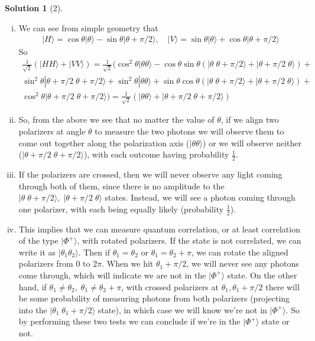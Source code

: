 \documentclass[11pt]{article}
\theoremstyle{definition}
\newtheorem*{solution}{Solution}
\newcommand{\eq}{\begin{equation}\begin{aligned}}
\newcommand{\qe}{\end{aligned}\end{equation}}
\newcommand{\ket}[1]{|#1\rangle}
\begin{document}
\begin{solution}[2]
  \begin{enumerate}[(i)]
    \item We can see from simple geometry that
    \eq
      \ket{H}=\cos\theta\ket{\theta}-\sin\theta\ket{\theta+\pi/2},\quad \ket{V}=\sin\theta\ket{\theta}+\cos\theta\ket{\theta+\pi/2}
    \qe
    So
    \eq
      \frac{1}{\sqrt{2}}(\ket{HH}+\ket{VV})=\frac{1}{\sqrt{2}}(\cos^2\theta\ket{\theta\theta}-\cos\theta\sin\theta(\ket{\theta\;\theta+\pi/2}+\ket{\theta+\pi/2\;\theta})+\\
      \sin^2\theta\ket{\theta+\pi/2\;\theta+\pi/2}+\sin^2\theta\ket{\theta\theta}+\sin\theta\cos\theta(\ket{\theta\;\theta+\pi/2}+\ket{\theta+\pi/2\;\theta})+\\
      \cos^2\theta\ket{\theta+\pi/2\;\theta+\pi/2})=\boxed{\frac{1}{\sqrt{2}}(\ket{\theta\theta}+\ket{\theta+\pi/2\;\theta+\pi/2})}
    \qe
    \item So, from the above we see that no matter the value of $\theta$, if we align two polarizers at angle $\theta$ to measure the two photons we will observe them to come out together along the polarization axis ($\ket{\theta\theta}$) or we will observe neither ($\ket{\theta+\pi/2\;\theta+\pi/2}$), with each outcome having probability $\frac{1}{2}$.
    \item If the polarizers are crossed, then we will never observe any light coming through both of them, since there is no amplitude to the $\ket{\theta\;\theta+\pi/2},\;\ket{\theta+\pi/2\;\theta}$ states. Instead, we will see a photon coming through one polarizer, with each being equally likely (probability $\boxed{\frac{1}{2}}$).
    \item This implies that we can measure quantum correlation, or at least correlation of the type $\ket{\Phi^+}$, with rotated polarizers. If the state is not correlated, we can write it as $\ket{\theta_1\theta_2}$. Then if $\theta_1=\theta_2$ or $\theta_1=\theta_2+\pi$, we can rotate the aligned polarizers from 0 to $2\pi$. When we hit $\theta_1+\pi/2$, we will never see any photons come through, which will indicate we are not in the $\ket{\Phi^+}$ state. On the other hand, if $\theta_1\neq \theta_2,\;\theta_1\neq \theta_2+\pi$, with crossed polarizers at $\theta_1,\theta_1+\pi/2$ there will be some probability of measuring photons from both polarizers (projecting into the $\ket{\theta_1\;\theta_1+\pi/2}$ state), in which case we will know we're not in $\ket{\Phi^+}$. So by performing these two tests we can conclude if we're in the $\ket{\Phi^+}$ state or not.

\end{enumerate}
\end{solution}
\end{document}
